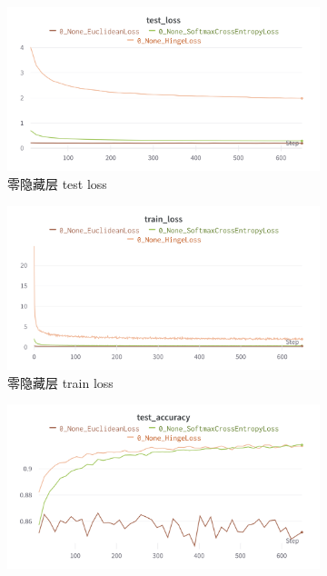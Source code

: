 \documentclass{article}
\begin{document}
\begin{figure}[htbp]
	\centering
	\begin{subfigure}{0.475\textwidth}
		\centering
		\includegraphics[width=1\textwidth]{../pics/零层实验-test-loss.png}
		\caption{零隐藏层 test loss}
	\end{subfigure}
	\begin{subfigure}{0.475\textwidth}
		\centering
		\includegraphics[width=1\textwidth]{../pics/零层实验-train-loss.png}
		\caption{零隐藏层 train loss}
	\end{subfigure}
	\begin{subfigure}{0.475\textwidth}
		\centering
		\includegraphics[width=1\textwidth]{../pics/零层实验-test-acc.png}

\end{subfigure}
\end{figure}
\end{document}
